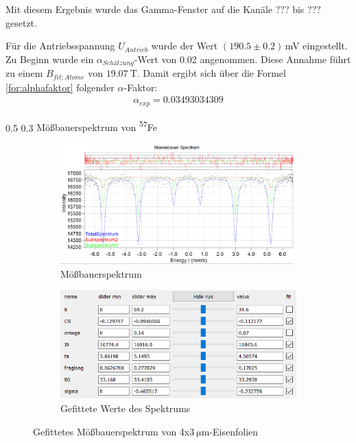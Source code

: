 \documentclass[german, %
parskip=full, %
bibliography=totoc, %
]{scrartcl}
\makeatletter
\renewcommand\subsection{\@startsection 
   {subsection}{2}{0mm}%
   {0.5\baselineskip}%
   {0.3\baselineskip}%
   {\bfseries\sffamily\large}%
   }
\makeatother
\begin{document}
Mit diesem Ergebnis wurde das Gamma-Fenster auf die Kanäle ??? bis ??? gesetzt.

Für die Antriebsspannung $U_{Antrieb}$ wurde der Wert $(190.5 \pm 0.2)$\,mV eingestellt. Zu Beginn wurde ein $\alpha_{Schätzung}$-Wert von 0.02 angenommen. Diese Annahme führt zu einem $B_{fit;Atome}$ von \(\SI{19.07}{\tesla}\). Damit ergibt sich über die Formel \ref{for:alphafaktor} folgender $\alpha$-Faktor:
\begin{align*}
\alpha_{exp} = 0.03493034309
\end{align*} 

\subsection{Mößbauerspektrum von \textsuperscript{57}Fe}

\begin{figure}[ht]
	\centering
	\begin{subfigure}[b]{0.5\textwidth}
		\includegraphics[width=\textwidth]{MoessbauerEisen4x3}
	  \caption{Mößbauerspektrum}
	  \label{fig:moess4x3}
  \end{subfigure}
  \begin{subfigure}[b]{0.4\textwidth}
	  \includegraphics[width=\textwidth]{WerteEisen4x3}
	  \caption{Gefittete Werte des Spektrums}
	  \label{fig:werte4x3}
  \end{subfigure}
	\caption{Gefittetes Mößbauerspektrum von 4x\(\SI{3}{\micro\meter}\)-Eisenfolien}
\end{figure}
\end{document}
